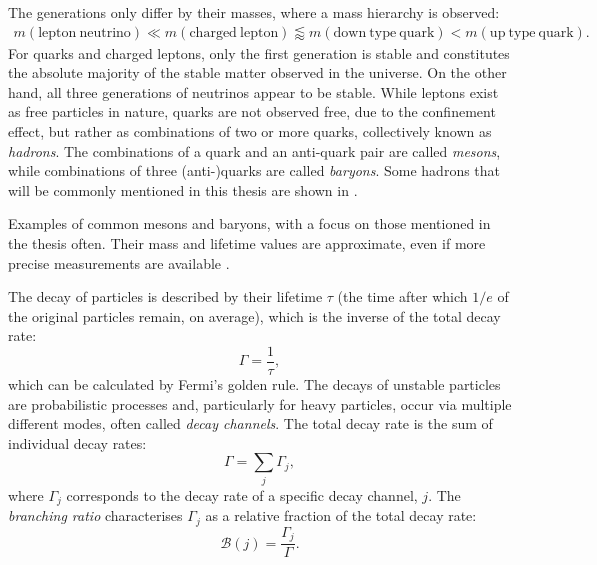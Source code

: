 The generations only differ by their masses, where a mass hierarchy is observed: 
\begin{align*}
    m(\mathrm{lepton~neutrino})\ll m(\mathrm{charged~lepton})\lessapprox m(\mathrm{down~type~quark})<m(\mathrm{up~type~quark}).
\end{align*}
For quarks and charged leptons, only the first generation is stable and constitutes the absolute majority of the stable matter observed in the universe.
On the other hand, all three generations of neutrinos appear to be stable.
While leptons exist as free particles in nature, quarks are not observed free, due to the confinement effect, 
but rather as combinations of two or more quarks, collectively known as \textit{hadrons}.
The combinations of a quark and an anti-quark pair are called \textit{mesons}, while combinations of three (anti-)quarks are called \textit{baryons}.
Some hadrons that will be commonly mentioned in this thesis are shown in .
\begin{table}[hbtp!]
    \centering
    \caption{\label{tab:hadrons}
    Examples of common mesons and baryons, with a focus on those mentioned in the thesis often.
    Their mass and lifetime values are approximate, even if more precise measurements are available \cite{Workman:2022ynf}.
    }
    
\end{table}

The decay of particles is described by their lifetime $\tau$ (the time after which $1/e$ of the original particles remain, on average), 
which is the inverse of the total decay rate:
\begin{equation}
    \Gamma = \frac{1}{\tau},
\end{equation}
which can be calculated by Fermi's golden rule.
The decays of unstable particles are probabilistic processes and, particularly for heavy particles, occur via multiple different modes, often called \textit{decay channels}.
The total decay rate is the sum of individual decay rates:
\begin{equation}
    \Gamma = \sum_j\Gamma_j,
\end{equation}
where $\Gamma_j$ corresponds to the decay rate of a specific decay channel, $j$.
The \textit{branching ratio} characterises $\Gamma_j$ as a relative fraction of the total decay rate:
\begin{equation}\label{eq:branching_fraction_definition}
    \mathcal{B}(j) = \frac{\Gamma_j}{\Gamma}.
\end{equation}

